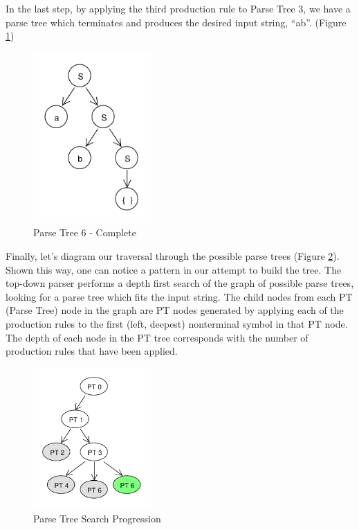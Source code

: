 \documentclass[11pt]{article}
\begin{document}
{In the last step, by applying the third production rule to Parse Tree 3, we have a parse tree which terminates and produces the
desired input string, ``ab''. (Figure \ref{fig:rdp_6})

\begin{figure}[h!]
    \centering
    \includegraphics[width=0.4\textwidth,natwidth=30,natheight=30]{umlet/rdp_6.pdf}
    \caption{Parse Tree 6 - Complete}
    \label{fig:rdp_6}
\end{figure}

Finally, let's diagram our traversal through the possible parse trees (Figure \ref{fig:rdp_7}). Shown this way, one can notice
a pattern in our attempt to build the tree. The top-down parser performs a depth first search of the 
graph of possible parse trees, looking for a parse tree which fits the input string.
The child nodes from each PT (Parse Tree) node in the graph are PT nodes generated by
applying each of the production rules to the first (left, deepest) nonterminal symbol in that PT node.
The depth of each node in the PT tree corresponds with the number of production rules that have been applied.

\begin{figure}[h!]
    \centering
    \includegraphics[width=0.4\textwidth,natwidth=30,natheight=30]{umlet/rdp_7.pdf}
    \caption{Parse Tree Search Progression}
    \label{fig:rdp_7}
\end{figure}

}
\end{document}
